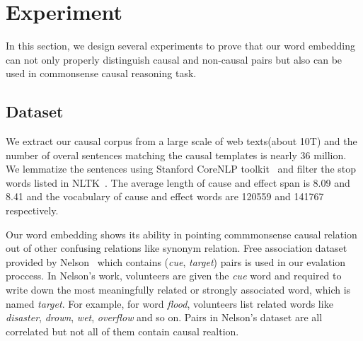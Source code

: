 \section{Experiment}
\label{sec:experiment}
In this section, we design several experiments to prove that our word embedding can not only properly distinguish causal and non-causal pairs but also can be used in commonsense causal reasoning task.

\subsection{Dataset}
We extract our causal corpus from a large scale of web texts(about 10T) and the number of overal sentences matching the causal templates is nearly 36 million. We lemmatize the sentences using Stanford CoreNLP toolkit~\cite{manning-EtAl:2014:P14-5} and filter the stop words listed in NLTK~\cite{bird2009natural}. The average length of cause and effect span is 8.09 and 8.41 and the vocabulary of cause and effect words are 120559 and 141767 respectively.

Our word embedding shows its ability in pointing commmonsense causal relation out of other confusing relations like synonym relation.
Free association dataset provided by Nelson~\cite{nelson2004university} which contains (\emph{cue}, \emph{target}) pairs is used in our evalation proccess. In Nelson's work, volunteers are given the \emph{cue} word and required to write down the most meaningfully related or strongly associated word, which is named \emph{target}. For example, for word \emph{flood}, volunteers list related words like \emph{disaster}, \emph{drown}, \emph{wet}, \emph{overflow} and so on. Pairs in Nelson's dataset are all correlated but not all of them contain causal realtion.

\begin{table}[th]
	\caption{Sample of human-labeled pairs. Score ranges from 0 to 8. }
	\label{tab:evalset}
\end{table}

